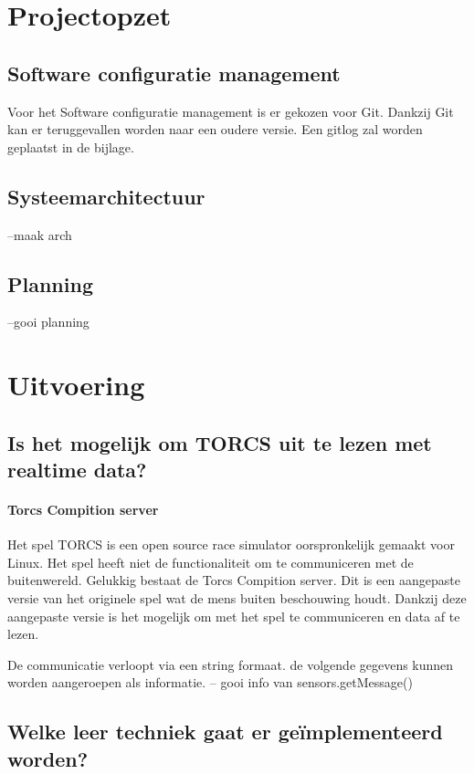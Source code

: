 \documentclass{article}
\begin{document}
\section{Projectopzet}
\subsection{Software configuratie management}
Voor het Software configuratie management is er gekozen voor Git. Dankzij Git kan er teruggevallen worden naar een oudere versie. Een gitlog zal worden geplaatst in de bijlage. 
\subsection{Systeemarchitectuur}
--maak arch
\subsection{Planning}
--gooi planning


\section{Uitvoering}

\subsection{Is het mogelijk om TORCS uit te lezen met realtime data?}
\paragraph{Torcs Compition server}
Het spel TORCS is een open source race simulator oorspronkelijk gemaakt voor Linux. Het spel heeft niet de functionaliteit om te communiceren met de buitenwereld. Gelukkig bestaat de Torcs Compition server. Dit is een aangepaste versie van het originele spel wat de mens buiten beschouwing houdt. Dankzij deze aangepaste versie is het mogelijk om met het spel te communiceren en data af te lezen. 
\newline
\newline

De communicatie verloopt via een string formaat. de volgende gegevens kunnen worden aangeroepen als informatie. 
-- gooi info van sensors.getMessage()

\subsection{Welke leer techniek gaat er geïmplementeerd worden?}
\end{document}
